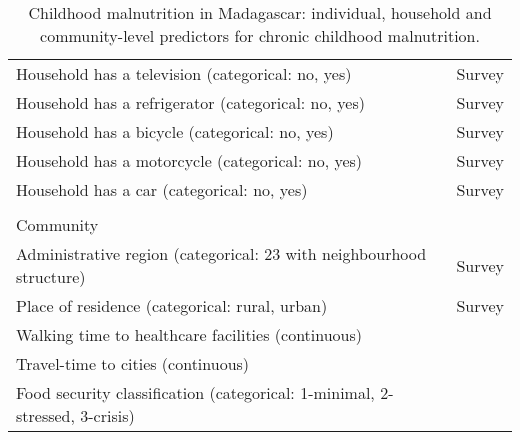 \begin{table}[!p]
\begin{tabularx}{\textwidth}{lr}
        Household has a television (categorical: no, yes) & Survey\\
        Household has a refrigerator (categorical: no, yes) & Survey\\
        Household has a bicycle (categorical: no, yes) & Survey\\
        Household has a motorcycle (categorical: no, yes) & Survey\\
        Household has a car (categorical: no, yes) & Survey\\
                                                & \\
    Community                                   & \\ \arrayrulecolor{black!10}\midrule
        Administrative region (categorical: 23 with neighbourhood structure)& Survey\\
        Place of residence (categorical: rural, urban) & Survey\\
        Walking time to healthcare facilities (continuous) & \textcite{weissGlobalMapsTravel2020}\\
        Travel-time to cities (continuous) & \textcite{weissGlobalMapTravel2018}\\
        Food security classification (categorical: 1-minimal, 2-stressed, 3-crisis) & \textcite{fewsnetFEWSNETData2022}\\
    \end{tabularx}

    \caption{Childhood malnutrition in Madagascar: individual, household and community-level predictors for chronic childhood malnutrition.}
    \label{tab:malnutritionpredictors}
    
\end{table}